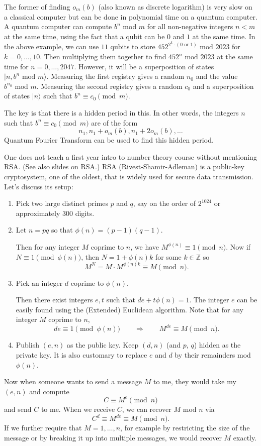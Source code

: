 \documentclass{article}
\def\Z{{\mathbb Z}}
\def\Z{{\mathbb Z}}
\newcommand{\add}[1]{{\color{blue} #1}}
\begin{document}
The former of finding $o_m(b)$ (also known as discrete logarithm) is very slow on a classical computer but can be done in polynomial time on a quantum computer. A quantum computer can compute $b^n$ mod $m$ for all non-negative integers $n < m$ at the same time, using the fact that a qubit can be $0$ and $1$ at the same time. In the above example, we can use $11$ qubits to store $452^{2^k\cdot(0\text{ or }1)}\text{ mod }2023$ for $k = 0,\ldots,10$. Then multiplying them together to find $452^n\text{ mod }2023$ at the same time for $n = 0,\ldots,2047$.  However, it will be a superposition of states $|n, b^n\mbox{ mod }m\rangle$. Measuring the first registry gives a random $n_0$ and the value $b^{n_0}\mbox{ mod }m$. Measuring the second registry gives a random $c_0$ and a superposition of states $|n\rangle$ such that $b^n\equiv c_0\pmod{m}$.

    The key is that there is a hidden period in this. In other words, the integers $n$ such that $b^n\equiv c_0\pmod{m}$ are of the form
    $$n_1, n_1 + o_m(b), n_1 + 2o_m(b), \ldots$$
 Quantum Fourier Transform can be used to find this hidden period.


\vspace{5pt}
One does not teach a first year intro to number theory course without mentioning RSA. \add{(See also slides on RSA.)} RSA (Rivest-Shamir-Adleman) is a public-key cryptosystem, one of the oldest, that is widely used for secure data transmission. Let's discuss its setup:
\begin{enumerate}
    \item Pick two large distinct primes $p$ and $q$, say on the order of $2^{1024}$ or approximately $300$ digits.
    \item Let $n = pq$ so that $\phi(n) = (p-1)(q-1)$.

    Then for any integer $M$ coprime to $n$, we have $M^{\phi(n)}\equiv 1\pmod{n}$. Now if $N\equiv 1\pmod{\phi(n)}$, then $N = 1 + \phi(n)k$ for some $k\in\Z$ so
    $$M^N = M\cdot M^{\phi(n)k} \equiv M\pmod{n}.$$
    \item Pick an integer $d$ coprime to $\phi(n)$.

    Then there exist integers $e,t$ such that $de + t\phi(n)=1$. The integer $e$ can be easily found using the (Extended) Euclidean algorithm. Note that for any integer $M$ coprime to $n$,
    $$de \equiv 1\pmod{\phi(n)} \qquad\Longrightarrow\qquad M^{de}\equiv M\pmod{n}.$$
    \item Publish $(e,n)$ as the public key. Keep $(d,n)$ (and $p$, $q$) hidden as the private key. It is also customary to replace $e$ and $d$ by their remainders mod $\phi(n)$.
\end{enumerate}
Now when someone wants to send a message $M$ to me, they would take my $(e,n)$ and compute $$C \equiv M^e\pmod{n}$$
and send $C$ to me. When we receive $C$, we can recover $M$ mod $n$ via
$$C^d\equiv M^{de} \equiv M\pmod{n}.$$
If we further require that $M = 1,\ldots, n$, for example by restricting the size of the message or by breaking it up into multiple messages, we would recover $M$ exactly.
\end{document}
